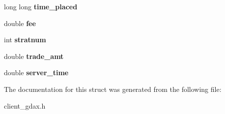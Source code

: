 \begin{DoxyCompactItemize}
\mbox{\label{structorder_aa1738a86eda61691ac87fe522f8cf503}} 
long long {\bfseries time\+\_\+placed}
\item 
\mbox{\label{structorder_a22ed5f82d2620fc87e5ff70c249164dd}} 
double {\bfseries fee}
\item 
\mbox{\label{structorder_ae78e554fc6be338f506a16371e1535d9}} 
int {\bfseries stratnum}
\item 
\mbox{\label{structorder_a5efeca7d6fb75f1ebe2798194a2c0a60}} 
double {\bfseries trade\+\_\+amt}
\item 
\mbox{\label{structorder_af7302f45dbe9bd1e9a04b08145525314}} 
double {\bfseries server\+\_\+time}
\end{DoxyCompactItemize}


The documentation for this struct was generated from the following file\+:\begin{DoxyCompactItemize}
\item 
client\+\_\+gdax.\+h\end{DoxyCompactItemize}
